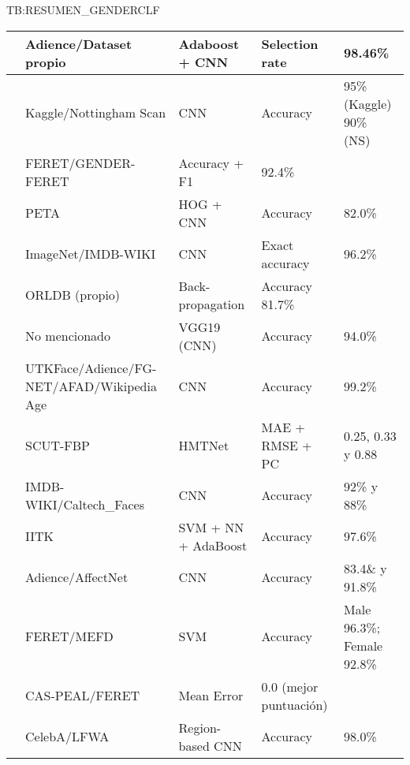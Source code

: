 \begin{landscape}
\begin{table}[Resumen de papers género]{TB:RESUMEN_GENDERCLF}
\begin{tabular}{cp{2.5cm}p{4cm}p{4cm}p{4cm}}
    \hline
    \cite{wu2020gender} & Adience/Dataset propio & Adaboost + CNN & Selection rate & 98.46\% \\
    \hline
    \cite{sumi2021human} & Kaggle/Nottingham Scan & CNN & Accuracy & 95\% (Kaggle) 90\% (NS) \\
    \hline
    \cite{dwivedi2019review} & FERET/GENDER-FERET & Accuracy + F1 & 92.4\% \\
    \hline
    \cite{raza2018appearance} & PETA & HOG + CNN & Accuracy & 82.0\% \\
    \hline
    \cite{agbo2020deeply} & ImageNet/IMDB-WIKI & CNN & Exact accuracy & 96.2\% \\
    \hline
    \cite{mzhang2020gender} & ORLDB (propio) & Back-propagation & Accuracy 81.7\% \\
    \hline
    \cite{zhang2020gender} & No mencionado & VGG19 (CNN) & Accuracy & 94.0\% \\
    \hline
    \cite{garain2021gra_net} & UTKFace/Adience/FG-NET/AFAD/Wikipedia Age & CNN & Accuracy & 99.2\% \\
    \hline
    \cite{xu2019hierarchical} & SCUT-FBP & HMTNet & MAE + RMSE + PC & 0.25, 0.33 y 0.88 \\
    \hline
    \cite{islam2020human} & IMDB-WIKI/Caltech_Faces & CNN & Accuracy & 92\% y 88\% \\
    \hline
    \cite{verma2019local} & IITK & SVM + NN + AdaBoost & Accuracy & 97.6\% \\
    \hline
    \cite{gurnani2019saf} & Adience/AffectNet & CNN & Accuracy & 83.4\pm1.6\& y 91.8\pm1.2\% \\
    \hline
    \cite{loo2018influence} & FERET/MEFD & SVM & Accuracy & Male 96.3\%; Female 92.8\% \\
    \hline
    \cite{yilmaz2021evolutionary} & CAS-PEAL/FERET & Mean Error & 0.0 (mejor puntuación) \\
    \hline
    \cite{ranjan2017hyperface} & CelebA/LFWA & Region-based CNN & Accuracy & 98.0\% \\
    \hline
    \hline
  \end{tabular}
\end{table}
\end{landscape}


